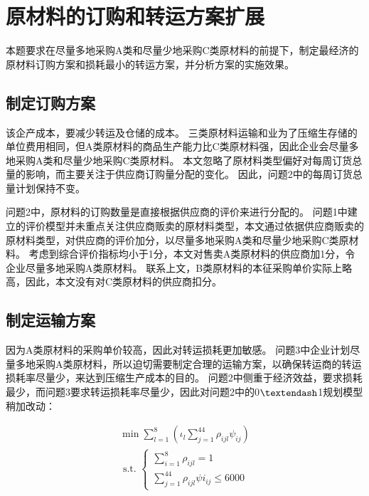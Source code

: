 
\section{原材料的订购和转运方案扩展}

本题要求在尽量多地采购A类和尽量少地采购C类原材料的前提下，制定最经济的原材料订购方案和损耗最小的转运方案，并分析方案的实施效果。

\subsection{制定订购方案}

该企产成本，要减少转运及仓储的成本。
三类原材料运输和业为了压缩生存储的单位费用相同，但A类原材料的商品生产能力比C类原材料强，因此企业会尽量多地采购A类和尽量少地采购C类原材料。
本文忽略了原材料类型偏好对每周订货总量的影响，而主要关注于供应商订购量分配的变化。
因此，问题2中的每周订货总量计划保持不变。

问题2中，原材料的订购数量是直接根据供应商的评价来进行分配的。
问题1中建立的评价模型并未重点关注供应商贩卖的原材料类型，本文通过依据供应商贩卖的原材料类型，对供应商的评价加分，以尽量多地采购A类和尽量少地采购C类原材料。
考虑到综合评价指标均小于1分，本文对售卖A类原材料的供应商加1分，令企业尽量多地采购A类原材料。
联系上文，B类原材料的本征采购单价实际上略高，因此，本文没有对C类原材料的供应商扣分。

\subsection{制定运输方案}

因为A类原材料的采购单价较高，因此对转运损耗更加敏感。
问题3中企业计划尽量多地采购A类原材料，所以迫切需要制定合理的运输方案，以确保转运商的转运损耗率尽量少，来达到压缩生产成本的目的。
问题2中侧重于经济效益，要求损耗最少，而问题3要求转运损耗率尽量少，因此对问题2中的0$\textendash$1规划模型稍加改动：

\begin{equation}
\begin{array}{l}
\min \sum_{l=1}^{8}\left(\iota_{l} \sum_{j=1}^{44} \rho_{i j l} \psi_{i j}\right) \\
\text { s.t. }\left\{\begin{array}{l}
\sum_{i=1}^{8} \rho_{i j l}=1 \\
\sum_{j=1}^{44} \rho_{i j l} \psi i_{i j} \leq 6000
\end{array}\right.
\end{array}
\end{equation}

